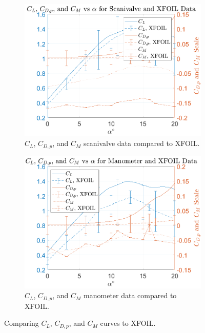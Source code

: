 \documentclass[runningheads]{llncs}
\begin{document}
\begin{figure}[h]
    \centering
    \begin{subfigure}[b]{0.45\textwidth}
         \centering
         \includegraphics[width=\textwidth]{figures/scanivalve_XFOIL_cl_vs_cd.png}
         \caption{$C_L$, $C_{D,p}$, and $C_M$ scanivalve data compared to XFOIL.}
         \label{fig:scani_comp}
     \end{subfigure}
     \begin{subfigure}[b]{0.45\textwidth}
         \centering
         \includegraphics[width=\textwidth]{figures/manometer_XFOIL_cl_vs_cd.png}
         \caption{$C_L$, $C_{D,p}$, and $C_M$ manometer data compared to XFOIL.}
         \label{fig:mano_comp}
     \end{subfigure}
    \caption{Comparing $C_L$, $C_{D,p}$, and $C_M$ curves to XFOIL.}
    \label{fig:curve_comp}
\end{figure}
\end{document}
